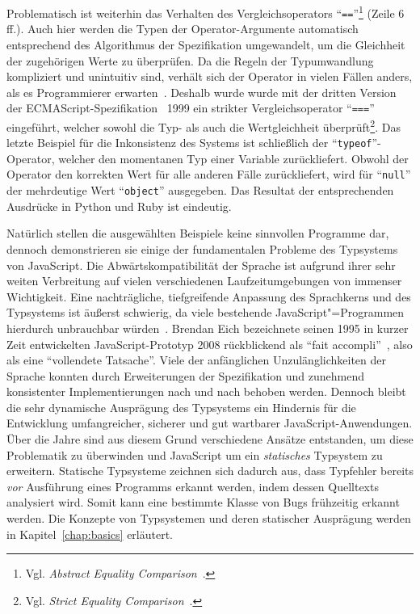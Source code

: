 \bigbreak


Problematisch ist weiterhin das Verhalten des Vergleichsoperators \enquote{\texttt{==}}\footnote{Vgl. \textit{Abstract Equality Comparison}~\autocite[Abschnitt 7.2.14]{ECMASCRIPT:2019}.} (Zeile 6 ff.). Auch hier werden die Typen der Operator-Argumente automatisch entsprechend des Algorithmus der Spezifikation umgewandelt, um die Gleichheit der zugehörigen Werte zu überprüfen. Da die Regeln der Typumwandlung kompliziert und unintuitiv sind, verhält sich der Operator in vielen Fällen anders, als es Programmierer erwarten~\autocite{PRADEL:2015}. Deshalb wurde wurde mit der dritten Version der ECMAScript-Spezifikation~\autocite{ECMASCRIPT:1999} 1999 ein strikter Vergleichsoperator \enquote{\texttt{===}} eingeführt, welcher sowohl die Typ- als auch die Wertgleichheit überprüft\footnote{Vgl. \textit{Strict Equality Comparison}~\autocite[Abschnitt 7.2.15]{ECMASCRIPT:2019}.}.
Das letzte Beispiel für die Inkonsistenz des Systems ist schließlich der \enquote{\texttt{typeof}}-Operator, welcher den momentanen Typ einer Variable zurückliefert. Obwohl der Operator den korrekten Wert für alle anderen Fälle zurückliefert, wird für \enquote{\texttt{null}} der mehrdeutige Wert \enquote{\texttt{object}} ausgegeben. Das Resultat der entsprechenden Ausdrücke in Python und Ruby ist eindeutig.

Natürlich stellen die ausgewählten Beispiele keine sinnvollen Programme dar, dennoch demonstrieren sie einige der fundamentalen Probleme des Typsystems von JavaScript. Die Abwärtskompatibilität der Sprache ist aufgrund ihrer sehr weiten Verbreitung auf vielen verschiedenen Laufzeitumgebungen von immenser Wichtigkeit. Eine nachträgliche, tiefgreifende Anpassung des Sprachkerns und des Typsystems ist äußerst schwierig, da viele bestehende JavaScript"=Programmen hierdurch unbrauchbar würden~\autocite[1]{CROCKFORD:JS_GOOD_PARTS}. Brendan Eich bezeichnete seinen 1995 in kurzer Zeit entwickelten JavaScript-Prototyp 2008 rückblickend als \enquote{fait accompli}~\autocite{EICH:POPULARITY}, also als eine \enquote{vollendete Tatsache}. Viele der anfänglichen Unzulänglichkeiten der Sprache konnten durch Erweiterungen der Spezifikation und zunehmend konsistenter Implementierungen nach und nach behoben werden. Dennoch bleibt die sehr dynamische Ausprägung des Typsystems ein Hindernis für die Entwicklung umfangreicher, sicherer und gut wartbarer JavaScript-Anwendungen. Über die Jahre sind aus diesem Grund verschiedene Ansätze entstanden, um diese Problematik zu überwinden und JavaScript um ein \emph{statisches} Typsystem zu erweitern. Statische Typsysteme zeichnen sich dadurch aus, dass Typfehler bereits \emph{vor} Ausführung eines Programms erkannt werden, indem dessen Quelltexts analysiert wird. Somit kann eine bestimmte Klasse von Bugs frühzeitig erkannt werden. Die Konzepte von Typsystemen und deren statischer Ausprägung werden in Kapitel~\ref{chap:basics} erläutert.

